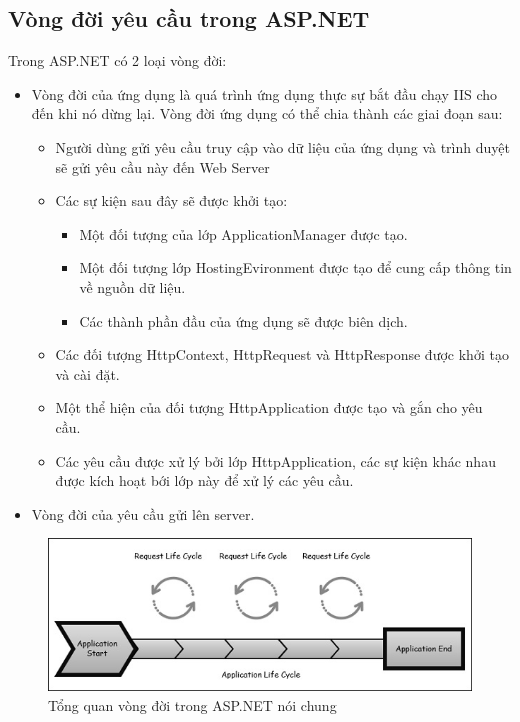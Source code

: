 \subsection{Vòng đời yêu cầu trong ASP.NET}
Trong ASP.NET có 2 loại vòng đời:
\begin{itemize}
	\item Vòng đời của ứng dụng là quá trình ứng dụng thực sự bắt đầu chạy IIS cho đến khi nó dừng lại. Vòng đời ứng dụng có thể chia thành các giai đoạn sau:
	\begin{itemize}
		\item Người dùng gửi yêu cầu truy cập vào dữ liệu của ứng dụng và trình duyệt sẽ gửi yêu cầu này đến Web Server
		\item Các sự kiện sau đây sẽ được khởi tạo:
		\begin{itemize}
			\item Một đối tượng của lớp ApplicationManager được tạo.
			\item Một đối tượng lớp HostingEvironment được tạo để cung cấp thông tin về nguồn dữ liệu.
			\item Các thành phần đầu của ứng dụng sẽ được biên dịch.
		\end{itemize}
		\item Các đối tượng HttpContext, HttpRequest và HttpResponse được khởi tạo và cài đặt.
		\item Một thể hiện của đối tượng HttpApplication được tạo và gắn cho yêu cầu.
		\item Các yêu cầu được xử lý bởi lớp HttpApplication, các sự kiện khác nhau được kích hoạt bới lớp này để xử lý các yêu cầu.
	\end{itemize}
	\item Vòng đời của yêu cầu gửi lên server.
\end{itemize}
\begin{center}
    \begin{figure}[h]
    \begin{center}
     \includegraphics[scale=1.0]{image/vongdoiMVC.png}
    \end{center}
    \caption{Tổng quan vòng đời trong ASP.NET nói chung}
    \label{refhinh2_4}
    \end{figure}
\end{center}
